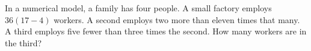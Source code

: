 In a numerical model, a family has four people. A small factory employs $36(17-4)$ workers. A second employs two more than eleven times that many. A third employs five fewer than three times the second. How many workers are in the third?

